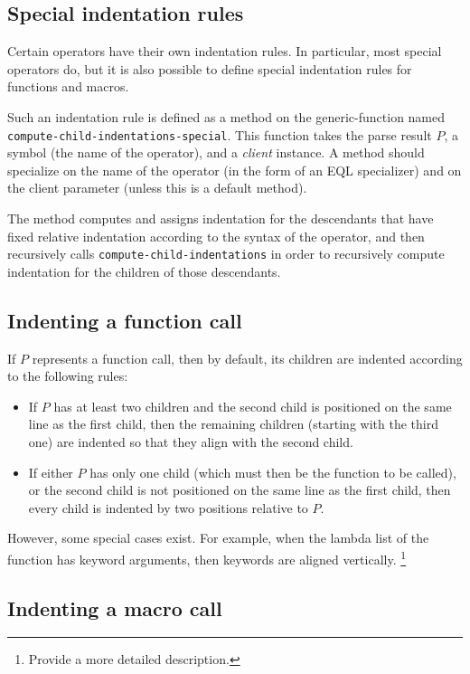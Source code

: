 \subsection{Special indentation rules}

Certain operators have their own indentation rules.  In particular,
most special operators do, but it is also possible to define special
indentation rules for functions and macros.

Such an indentation rule is defined as a method on the
generic-function named \texttt{compute-child-indentations-special}.
This function takes the parse result $P$, a symbol (the name of the
operator), and a \emph{client} instance.  A method should specialize
on the name of the operator (in the form of an EQL specializer) and on
the client parameter (unless this is a default method).

The method computes and assigns indentation for the descendants that
have fixed relative indentation according to the syntax of the
operator, and then recursively calls
\texttt{compute-child-indentations} in order to recursively compute
indentation for the children of those descendants.

\subsection{Indenting a function call}

If $P$ represents a function call, then by default, its children are
indented according to the following rules:

\begin{itemize}
\item If $P$ has at least two children and the second child is
  positioned on the same line as the first child, then the remaining
  children (starting with the third one) are indented so that they
  align with the second child.
\item If either $P$ has only one child (which must then be the
  function to be called), or the second child is not positioned on the
  same line as the first child, then every child is indented by two
  positions relative to $P$.
\end{itemize}

However, some special cases exist.  For example, when the lambda list
of the function has keyword arguments, then keywords are aligned
vertically.%
\footnote{Provide a more detailed description.}

\subsection{Indenting a macro call}

